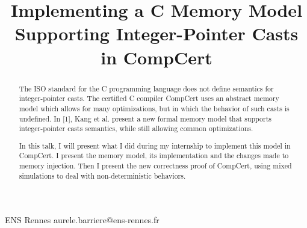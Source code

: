 \documentclass[nocopyrightspace]{sigplanconf}
\begin{document}
\setlength{\pdfpageheight}{\paperheight}
\setlength{\pdfpagewidth}{\paperwidth}






\title{Implementing a C Memory Model Supporting Integer-Pointer Casts in CompCert}

	{ENS Rennes}
           {aurele.barriere@ens-rennes.fr}

\maketitle





\begin{abstract}

The ISO standard for the C programming language does not define semantics for integer-pointer casts. The certified C compiler CompCert uses an abstract memory model which allows for many optimizations, but in which the behavior of such casts is undefined. In [1], Kang et al. present a new formal memory model that supports integer-pointer casts semantics, while still allowing common optimizations.

In this talk, I will present what I did during my internship to implement this model in CompCert.
I present the memory model, its implementation and the changes made to memory injection.
Then I present the new correctness proof of CompCert, using mixed simulations to deal with non-deterministic behaviors.
 
\end{abstract}
\end{document}
